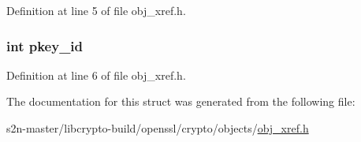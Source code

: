 Definition at line 5 of file obj\+\_\+xref.\+h.

\subsubsection[{\texorpdfstring{pkey\+\_\+id}{pkey_id}}]{\setlength{\rightskip}{0pt plus 5cm}int pkey\+\_\+id}\hypertarget{structnid__triple_a1021097b3af14d7ae24a3756def116d2}{}\label{structnid__triple_a1021097b3af14d7ae24a3756def116d2}


Definition at line 6 of file obj\+\_\+xref.\+h.



The documentation for this struct was generated from the following file\+:\begin{DoxyCompactItemize}
\item 
s2n-\/master/libcrypto-\/build/openssl/crypto/objects/\hyperlink{obj__xref_8h}{obj\+\_\+xref.\+h}\end{DoxyCompactItemize}
